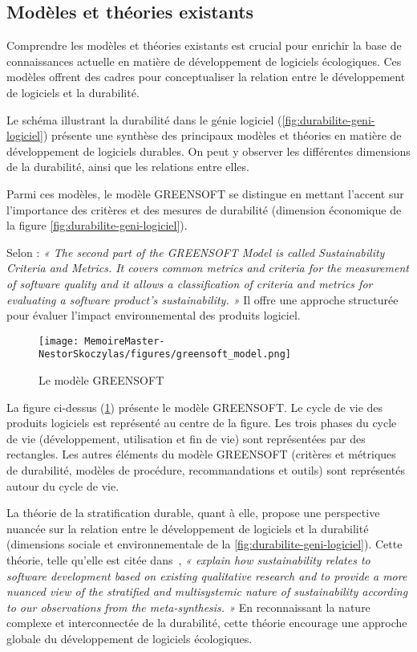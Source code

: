 \subsection{Modèles et théories existants}
Comprendre les modèles et théories existants est crucial pour enrichir la base de connaissances actuelle en matière de développement de logiciels écologiques. Ces modèles offrent des cadres pour conceptualiser la relation entre le développement de logiciels et la durabilité.


Le schéma illustrant la durabilité dans le génie logiciel (\ref{fig:durabilite-geni-logiciel}) présente une synthèse des principaux modèles et théories en matière de développement de logiciels durables. On peut y observer les différentes dimensions de la durabilité, ainsi que les relations entre elles.


Parmi ces modèles, le modèle GREENSOFT se distingue en mettant l'accent sur l'importance des critères et des mesures de durabilité (dimension économique de la figure \ref{fig:durabilite-geni-logiciel}).

Selon \cite{GreenSoftModel} : \emph{« The second part of the GREENSOFT Model is called Sustainability Criteria and Metrics. It covers common metrics and criteria for the measurement of software quality and it allows a classification of criteria and metrics for evaluating a software product’s sustainability. »} Il offre une approche structurée pour évaluer l'impact environnemental des produits logiciel.

\begin{figure}[H]
    \centering
    \texttt{[image: MemoireMaster-NestorSkoczylas/figures/greensoft\_model.png]}
    \caption{Le modèle GREENSOFT}
    \label{fig:greensoft-model}
\end{figure}

La figure ci-dessus (\ref{fig:greensoft-model}) présente le modèle GREENSOFT. Le cycle de vie des produits logiciels est représenté au centre de la figure. Les trois phases du cycle de vie (développement, utilisation et fin de vie) sont représentées par des rectangles. Les autres éléments du modèle GREENSOFT (critères et métriques de durabilité, modèles de procédure, recommandations et outils) sont représentés autour du cycle de vie.

La théorie de la stratification durable, quant à elle, propose une perspective nuancée sur la relation entre le développement de logiciels et la durabilité (dimensions sociale et environnementale de la \ref{fig:durabilite-geni-logiciel}). Cette théorie, telle qu’elle est citée dans~\cite{SustainableStratifiedTheory}, \emph{« explain how sustainability relates to software development based on existing qualitative research and to provide a more nuanced view of the stratified and multisystemic nature of sustainability according to our observations from the meta-synthesis. »} En reconnaissant la nature complexe et interconnectée de la durabilité, cette théorie encourage une approche globale du développement de logiciels écologiques.


